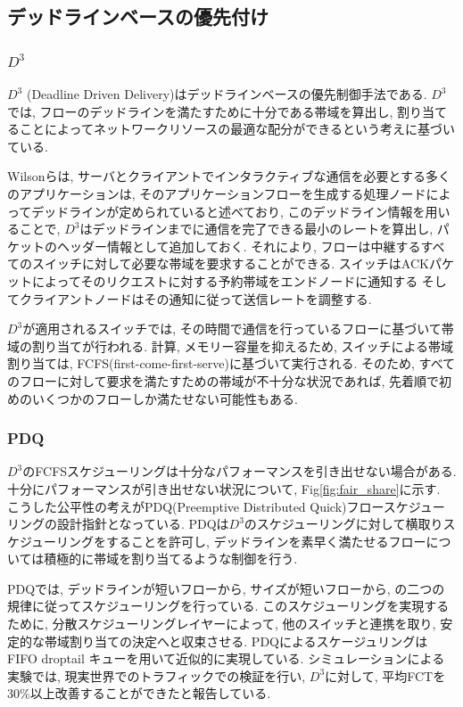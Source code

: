 \subsection{デッドラインベースの優先付け}
\subsubsection{$D^3$}
$D^3$ (Deadline Driven Delivery)\cite{d3}はデッドラインベースの優先制御手法である. 
$D^3$では, フローのデッドラインを満たすために十分である帯域を算出し,
割り当てることによってネットワークリソースの最適な配分ができるという考えに基づいている. 

Wilsonら\cite{d3}は, サーバとクライアントでインタラクティブな通信を必要とする多くのアプリケーションは,
そのアプリケーションフローを生成する処理ノードによってデッドラインが定められていると述べており, このデッドライン情報を用いることで,
$D^3$はデッドラインまでに通信を完了できる最小のレートを算出し, パケットのヘッダー情報として追加しておく. 
それにより, フローは中継するすべてのスイッチに対して必要な帯域を要求することができる. 
スイッチはACKパケットによってそのリクエストに対する予約帯域をエンドノードに通知する
そしてクライアントノードはその通知に従って送信レートを調整する. 

$D^3$が適用されるスイッチでは, その時間で通信を行っているフローに基づいて帯域の割り当てが行われる.
計算, メモリー容量を抑えるため, スイッチによる帯域割り当ては, FCFS(first-come-first-serve)に基づいて実行される. 
そのため, すべてのフローに対して要求を満たすための帯域が不十分な状況であれば, 先着順で初めのいくつかのフローしか満たせない可能性もある. 

\subsubsection{PDQ}
$D^3$のFCFSスケジューリングは十分なパフォーマンスを引き出せない場合がある. 
十分にパフォーマンスが引き出せない状況について, Fig\ref{fig:fair_share}に示す. 
こうした公平性の考えがPDQ(Preemptive Distributed Quick)フロースケジューリングの設計指針となっている. 
PDQは$D^3$のスケジューリングに対して横取りスケジューリングをすることを許可し,
デッドラインを素早く満たせるフローについては積極的に帯域を割り当てるような制御を行う. 

PDQでは, デッドラインが短いフローから, サイズが短いフローから, の二つの規律に従ってスケジューリングを行っている. 
このスケジューリングを実現するために, 分散スケジューリングレイヤーによって, 他のスイッチと連携を取り, 安定的な帯域割り当ての決定へと収束させる. 
PDQによるスケージュリングはFIFO droptail キューを用いて近似的に実現している. 
シミュレーションによる実験では, 現実世界でのトラフィックでの検証を行い, $D^3$に対して, 平均FCTを30\%以上改善することができたと報告している. 

